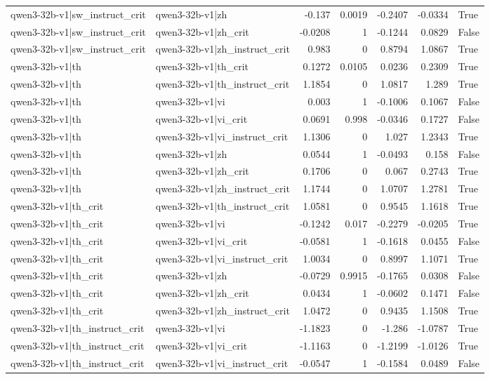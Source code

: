 \begin{table}
\begin{tabular}{l l r r r r l}
qwen3-32b-v1|sw_instruct_crit & qwen3-32b-v1|zh & -0.137 & 0.0019 & -0.2407 & -0.0334 & True \\
qwen3-32b-v1|sw_instruct_crit & qwen3-32b-v1|zh_crit & -0.0208 & 1 & -0.1244 & 0.0829 & False \\
qwen3-32b-v1|sw_instruct_crit & qwen3-32b-v1|zh_instruct_crit & 0.983 & 0 & 0.8794 & 1.0867 & True \\
qwen3-32b-v1|th & qwen3-32b-v1|th_crit & 0.1272 & 0.0105 & 0.0236 & 0.2309 & True \\
qwen3-32b-v1|th & qwen3-32b-v1|th_instruct_crit & 1.1854 & 0 & 1.0817 & 1.289 & True \\
qwen3-32b-v1|th & qwen3-32b-v1|vi & 0.003 & 1 & -0.1006 & 0.1067 & False \\
qwen3-32b-v1|th & qwen3-32b-v1|vi_crit & 0.0691 & 0.998 & -0.0346 & 0.1727 & False \\
qwen3-32b-v1|th & qwen3-32b-v1|vi_instruct_crit & 1.1306 & 0 & 1.027 & 1.2343 & True \\
qwen3-32b-v1|th & qwen3-32b-v1|zh & 0.0544 & 1 & -0.0493 & 0.158 & False \\
qwen3-32b-v1|th & qwen3-32b-v1|zh_crit & 0.1706 & 0 & 0.067 & 0.2743 & True \\
qwen3-32b-v1|th & qwen3-32b-v1|zh_instruct_crit & 1.1744 & 0 & 1.0707 & 1.2781 & True \\
qwen3-32b-v1|th_crit & qwen3-32b-v1|th_instruct_crit & 1.0581 & 0 & 0.9545 & 1.1618 & True \\
qwen3-32b-v1|th_crit & qwen3-32b-v1|vi & -0.1242 & 0.017 & -0.2279 & -0.0205 & True \\
qwen3-32b-v1|th_crit & qwen3-32b-v1|vi_crit & -0.0581 & 1 & -0.1618 & 0.0455 & False \\
qwen3-32b-v1|th_crit & qwen3-32b-v1|vi_instruct_crit & 1.0034 & 0 & 0.8997 & 1.1071 & True \\
qwen3-32b-v1|th_crit & qwen3-32b-v1|zh & -0.0729 & 0.9915 & -0.1765 & 0.0308 & False \\
qwen3-32b-v1|th_crit & qwen3-32b-v1|zh_crit & 0.0434 & 1 & -0.0602 & 0.1471 & False \\
qwen3-32b-v1|th_crit & qwen3-32b-v1|zh_instruct_crit & 1.0472 & 0 & 0.9435 & 1.1508 & True \\
qwen3-32b-v1|th_instruct_crit & qwen3-32b-v1|vi & -1.1823 & 0 & -1.286 & -1.0787 & True \\
qwen3-32b-v1|th_instruct_crit & qwen3-32b-v1|vi_crit & -1.1163 & 0 & -1.2199 & -1.0126 & True \\
qwen3-32b-v1|th_instruct_crit & qwen3-32b-v1|vi_instruct_crit & -0.0547 & 1 & -0.1584 & 0.0489 & False \\

\end{tabular}
\end{table}
